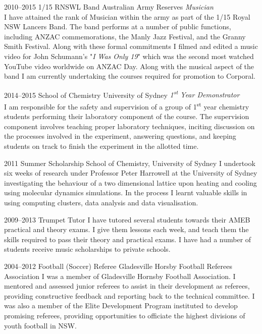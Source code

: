 \documentclass{friggeri-cv} %
\begin{document}
\begin{entrylist}

\entry
{2010--2015}
{1/15 RNSWL Band}
{Australian Army Reserves}
{\emph{Musician} \\
I have attained the rank of Musician within the army as part of the 1/15 Royal NSW Lancers Band. The band performs at a number of public functions, including ANZAC commemorations, the Manly Jazz Festival, and the Granny Smith Festival. Along with these formal commitments I filmed and edited a music video for John Schumann's "\emph{I Was Only 19}" which was the second most watched YouTube video worldwide on ANZAC Day. Along with the musical aspect of the band I am currently undertaking the courses required for promotion to Corporal.}


\entry
{2014--2015}
{School of Chemistry}
{University of Sydney}
{\emph{1\textsuperscript{st} Year Demonstrator} \\
    I am responsible for the safety and supervision of a group of 1\textsuperscript{st} year chemistry students performing their laboratory component of the course. The supervision component involves teaching proper laboratory techniques, inciting discussion on the processes involved in the experiment, answering questions, and keeping students on track to finish the experiment in the allotted time.}


\entry
{2011}
{Summer Scholarship}
{School of Chemistry, University of Sydney}
{I undertook six weeks of research under Professor Peter Harrowell at the University of Sydney investigating the behaviour of a two dimensional lattice upon heating and cooling using molecular dynamics simulations. In the process I learnt valuable skills in using computing clusters, data analysis and data visualisation.}


\entry
{2009--2013}
{Trumpet Tutor}
{}
{I have tutored several students towards their AMEB practical and theory exams. I give them lessons each week, and teach them the skills required to pass their theory and practical exams. I have had a number of students receive music scholarships to private schools.}

\entry
{2004--2012}
{Football (Soccer) Referee}
{Gladesville Horsby Football Referees Association}
{I was a member of Gladesville Hornsby Football Association. I mentored and assessed junior referees to assist in their development as referees, providing constructive feedback and reporting back to the technical committee. I was also a member of the Elite Development Program instituted to develop promising referees, providing opportunities to officiate the highest divisions of youth football in NSW.}

\end{entrylist}
\end{document}
